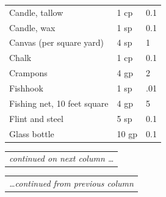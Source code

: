 \begin{multicols}{2}
\begin{minipage}{\columnwidth}
\begin{tabular}{|p{}|p{}|p{}|}
Candle, tallow	& 1 cp	& 0.1 \\
\rowcolor[gray]{.9}Candle, wax		& 1 sp	& 0.1 \\
Canvas (per square yard)	& 4 sp	& 1 \\
\rowcolor[gray]{.9}Chalk			& 1 cp	& 0.1 \\
Crampons			& 4 gp	& 2 \\
\rowcolor[gray]{.9}Fishhook			& 1 sp	& .01 \\
Fishing net, 10 feet square	& 4 gp	& 5 \\
\rowcolor[gray]{.9}Flint and steel		& 5 sp	& 0.1 \\
Glass bottle		& 10 gp	& 0.1 \\
\hline
\end{tabular}
\noindent
\begin{tabular}[r]{p{}}
\textit{continued on next column \ldots} \\
\end{tabular}

\end{minipage}

\noindent
\begin{minipage}{\columnwidth}

\noindent
\begin{tabular}[c]{p{}}
\textit{\ldots continued from previous column} \\
\end{tabular}


\end{minipage}
\end{multicols}

